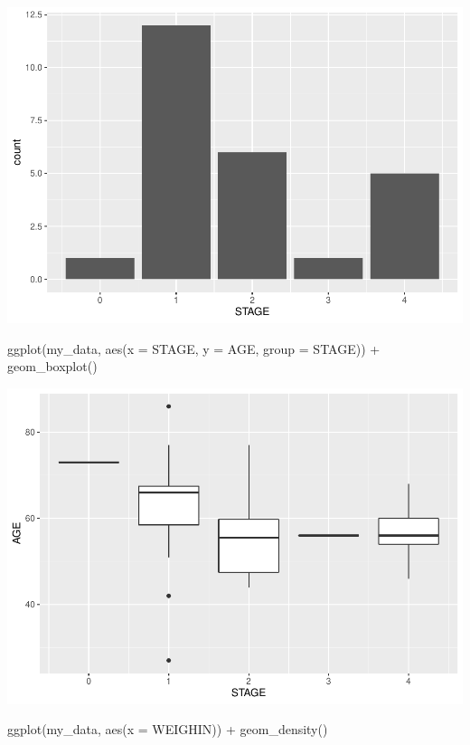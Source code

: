 \documentclass[
]{book}
\newenvironment{Shaded}{\begin{snugshade}}{\end{snugshade}}
\newcommand{\AttributeTok}[1]{\textcolor[rgb]{0.77,0.63,0.00}{#1}}
\newcommand{\FunctionTok}[1]{\textcolor[rgb]{0.00,0.00,0.00}{#1}}
\newcommand{\NormalTok}[1]{#1}
\newcommand{\SpecialCharTok}[1]{\textcolor[rgb]{0.00,0.00,0.00}{#1}}
\begin{document}
\includegraphics{_main_files/figure-latex/unnamed-chunk-92-1.pdf}

\begin{Shaded}
\begin{Highlighting}[]
\FunctionTok{ggplot}\NormalTok{(my\_data, }\FunctionTok{aes}\NormalTok{(}\AttributeTok{x =}\NormalTok{ STAGE, }\AttributeTok{y =}\NormalTok{ AGE, }\AttributeTok{group =}\NormalTok{ STAGE)) }\SpecialCharTok{+}
  \FunctionTok{geom\_boxplot}\NormalTok{()}
\end{Highlighting}
\end{Shaded}

\includegraphics{_main_files/figure-latex/unnamed-chunk-92-2.pdf}

\begin{Shaded}
\begin{Highlighting}[]
\FunctionTok{ggplot}\NormalTok{(my\_data, }\FunctionTok{aes}\NormalTok{(}\AttributeTok{x =}\NormalTok{ WEIGHIN)) }\SpecialCharTok{+}
  \FunctionTok{geom\_density}\NormalTok{()}
\end{Highlighting}
\end{Shaded}
\end{document}
